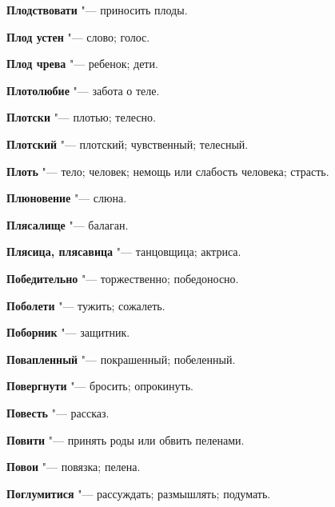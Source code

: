 \begin{mymulticols}{2}
\noindent\textbf{Плодствовати} "--- приносить плоды. 




\noindent\textbf{Плод устен} "--- слово; голос. 




\noindent\textbf{Плод чрева} "--- ребенок; дети. 




\noindent\textbf{Плотолюбие} "--- забота о теле. 




\noindent\textbf{Плотски} "--- плотью; телесно. 




\noindent\textbf{Плотский} "--- плотский; чувственный; телесный. 




\noindent\textbf{Плоть} "--- тело; человек; немощь или слабость человека; страсть. 




\noindent\textbf{Плюновение} "--- слюна. 




\noindent\textbf{Плясалище} "--- балаган. 




\noindent\textbf{Плясица, плясавица} "--- танцовщица; актриса. 




\noindent\textbf{Победительно} "--- торжественно; победоносно. 




\noindent\textbf{Поболети} "--- тужить; сожалеть. 




\noindent\textbf{Поборник} "--- защитник. 




\noindent\textbf{Повапленный} "--- покрашенный; побеленный. 




\noindent\textbf{Повергнути} "--- бросить; опрокинуть. 




\noindent\textbf{Повесть} "--- рассказ. 




\noindent\textbf{Повити} "--- принять роды или обвить пеленами. 




\noindent\textbf{Повои} "--- повязка; пелена. 




\noindent\textbf{Поглумитися} "--- рассуждать; размышлять; подумать. 





\end{mymulticols}
